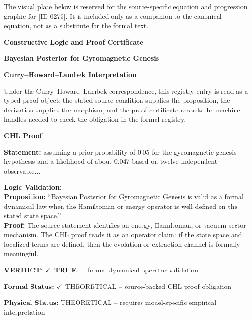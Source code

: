 \begingroup\footnotesize\sloppy
The visual plate below is reserved for the source-specific equation and progression graphic for [ID 0273]. It is included only as a companion to the canonical equation, not as a substitute for the formal text.
\par\endgroup
\ifTZPDarkEdition
{}
\fi

\clearpage
\begingroup\tzpsupportsetup
\noindent\textbf{\fontsize{10.8pt}{12.8pt}\selectfont [ID 0273] Constructive Logic and Proof Certificate}\par
\noindent\textbf{\fontsize{10pt}{12pt}\selectfont Bayesian Posterior for Gyromagnetic Genesis}\par
\vspace{0.45em}
\begingroup
\footnotesize
\setlength{\parskip}{0.22em}
\setlength{\parindent}{0pt}
\noindent\textbf{Curry--Howard--Lambek Interpretation}\par
Under the Curry--Howard--Lambek correspondence, this registry entry is read as a typed proof
object: the stated source condition supplies the proposition, the derivation supplies the
morphism, and the proof certificate records the machine handles needed to check the obligation
in the formal registry.

\vspace{0.45em}
\noindent\textbf{CHL Proof}\par
\textbf{Statement:} assuming a prior probability of 0.05 for the gyromagnetic genesis hypothesis and a
likelihood of about 0.047 based on twelve independent observable...

\textbf{Logic Validation:}\\
\textbf{Proposition:} ``Bayesian Posterior for Gyromagnetic Genesis is valid as a formal dynamical law when the
Hamiltonian or energy operator is well defined on the stated state space.''\\
\textbf{Proof:} The source statement identifies an energy, Hamiltonian, or vacuum-sector mechanism. The
CHL proof reads it as an operator claim: if the state space and localized terms are
defined, then the evolution or extraction channel is formally meaningful.

\textbf{VERDICT:} \ensuremath{\checkmark}\ \textbf{TRUE} --- formal dynamical-operator validation

\textbf{Formal Status:} \ensuremath{\checkmark}\ THEORETICAL -- source-backed CHL proof obligation

\textbf{Physical Status:} THEORETICAL -- requires model-specific empirical interpretation
\par\vspace{0.45em}
\par
\ifTZPDarkEdition
{}
\fi
\endgroup
\endgroup
